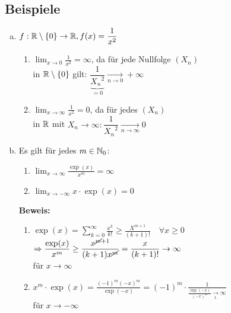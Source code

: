 \documentclass[10pt, a4paper, fleqn]{article}
\begin{document}
\subsection{Beispiele}
\begin{enumerate}[a)]
    \item $f: \mathbb{R} \setminus \{0\} \to \mathbb{R}, f(x) = \dfrac{1}{x^2}$
    \begin{enumerate}[1.]
        \item $\displaystyle \lim_{x \to 0} \frac{1}{x^2} = \infty$, da für jede Nullfolge $(X_n)$ \\
        in $\mathbb{R} \setminus \{0\}$ gilt: $\dfrac{1}{\underbrace{{X_n}^2}_{=0}} \xrightarrow[n \to 0]{} + \infty$
        \item $\displaystyle \lim_{x \to \infty} \frac{1}{x^2} = 0$, da für jedes $(X_n)$ \\
        in $\mathbb{R}$ mit $X_n \to \infty: \dfrac{1}{{X_n}^2} \xrightarrow[n \to \infty]{} 0$
    \end{enumerate}

    \item Es gilt für jedes $m \in \mathbb{N}_0$:
    \begin{enumerate}[1.]
        \item $\displaystyle \lim_{x \to \infty} \frac{\exp(x)}{x^m} = \infty$
        \item $\displaystyle \lim_{x \to -\infty} x \cdot \exp(x) = 0$
    \end{enumerate}
    \textbf{Beweis: }
    \begin{enumerate}[1.]
        \item $\displaystyle
            \exp(x) = \sum_{k = 0}^\infty \frac{x^k}{k!} \geq \frac{X^{m+1}}{(k+1)!} \quad \forall x \geq 0
        $ \\ $\displaystyle 
            \Rightarrow \frac{\exp(x)}{x^m} \geq \frac{x^{\cancel{m} + 1}}{(k+1)x^{\cancel{m}}} = \frac{x}{(k+1)!} \to \infty
        $ \\
        für $x \to \infty$
        \item $\displaystyle
            x^m \cdot \exp(x) = \frac{(-1)^m (-x)^m}{\exp(-x)} = (-1)^m \cdot \frac{1}{\boxed{\frac{\exp(-x)}{(-x)^m}} \underset{1.}{\to} \infty}
        $ \\
        für $x \to -\infty$
    \end{enumerate}
\end{enumerate}
\end{document}
